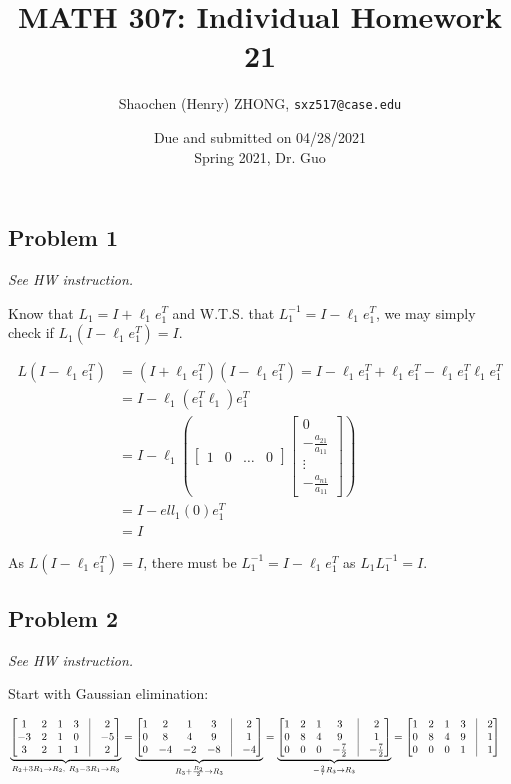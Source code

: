 \documentclass[11pt]{article}
\newcommand{\ilc}{\texttt}
\providecommand{\qbm}[1]{\begin{bmatrix} #1 \end{bmatrix}}
\begin{document}
\title{\textbf{MATH 307: Individual Homework 21}}


\author{Shaochen (Henry) ZHONG, \ilc{sxz517@case.edu}}

\date{Due and submitted on 04/28/2021 \\ Spring 2021, Dr. Guo}
\maketitle



\subsection*{Problem 1}
\textit{See HW instruction.}\newline

Know that $L_1 = I + \ell_1 e^T_1$ and W.T.S. that $L_1^{-1} = I - \ell_1 e^T_1$, we may simply check if $L_1 (I - \ell_1 e^T_1) = I$.

\begin{align*}
    L (I - \ell_1 e^T_1) &=  (I + \ell_1 e^T_1) (I - \ell_1 e^T_1) = I - \ell_1 e^T_1 + \ell_1 e^T_1 - \ell_1 e^T_1 \ell_1 e^T_1 \\
    &= I - \ell_1 (e^T_1 \ell_1) e^T_1 \\
    &= I - \ell_1 (\qbm{1 & 0 & \dots & 0} \qbm{0 \\ -\frac{a_{21}}{a_{11}} \\ \vdots \\ -\frac{a_{n1}}{a_{11}} }) \\
    &= I - ell_1 (0) e^T_1 \\
    &= I
\end{align*}

As $L (I - \ell_1 e^T_1) = I$, there must be $L_1^{-1} = I - \ell_1 e^T_1$ as $L_1 L_1^{-1} = I$.


\subsection*{Problem 2}
\textit{See HW instruction.}\newline

Start with Gaussian elimination:

\begin{align*}
    &\underbrace{\qbm{1 & 2 & 1 & 3 & \vline & 2 \\
        -3 & 2 & 1 & 0 & \vline & -5 \\
        3 & 2 & 1 & 1 & \vline & 2}}_{R_2 + 3R_1 \to R_2, \ R_3 - 3R_1 \to R_3} =
    \underbrace{\qbm{1 & 2 & 1 & 3 & \vline & 2 \\
        0 & 8 & 4 & 9 & \vline & 1 \\
        0 & -4 & -2 & -8 & \vline & -4}}_{R_3 + \frac{R_2}{2} \to R_3} =
    \underbrace{\qbm{1 & 2 & 1 & 3 & \vline & 2 \\
        0 & 8 & 4 & 9 & \vline & 1 \\
        0 & 0 & 0 & -\frac{7}{2} & \vline & -\frac{7}{2}}}_{-\frac{2}{7}R_3 \to R_3} =
    \qbm{1 & 2 & 1 & 3 & \vline & 2 \\
        0 & 8 & 4 & 9 & \vline & 1 \\
        0 & 0 & 0 & 1 & \vline & 1}
\end{align*}
\end{document}
